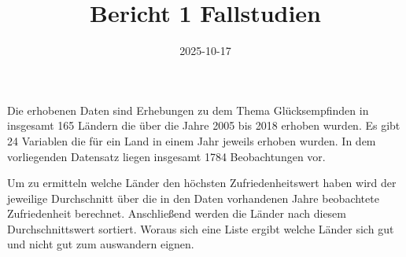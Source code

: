 \documentclass[
]{article}
\title{Bericht 1 Fallstudien}
\author{}
\date{\vspace{-2.5em}2025-10-17}
\newenvironment{Shaded}{\begin{snugshade}}{\end{snugshade}}
\newcommand{\AttributeTok}[1]{\textcolor[rgb]{0.13,0.29,0.53}{#1}}
\newcommand{\CommentTok}[1]{\textcolor[rgb]{0.56,0.35,0.01}{\textit{#1}}}
\newcommand{\DecValTok}[1]{\textcolor[rgb]{0.00,0.00,0.81}{#1}}
\newcommand{\FloatTok}[1]{\textcolor[rgb]{0.00,0.00,0.81}{#1}}
\newcommand{\FunctionTok}[1]{\textcolor[rgb]{0.13,0.29,0.53}{\textbf{#1}}}
\newcommand{\NormalTok}[1]{#1}
\newcommand{\SpecialCharTok}[1]{\textcolor[rgb]{0.81,0.36,0.00}{\textbf{#1}}}
\newcommand{\StringTok}[1]{\textcolor[rgb]{0.31,0.60,0.02}{#1}}
\begin{document}
\maketitle

Die erhobenen Daten sind Erhebungen zu dem Thema Glücksempfinden in
insgesamt 165 Ländern die über die Jahre 2005 bis 2018 erhoben wurden.
Es gibt 24 Variablen die für ein Land in einem Jahr jeweils erhoben
wurden. In dem vorliegenden Datensatz liegen insgesamt 1784
Beobachtungen vor.

Um zu ermitteln welche Länder den höchsten Zufriedenheitswert haben wird
der jeweilige Durchschnitt über die in den Daten vorhandenen Jahre
beobachtete Zufriedenheit berechnet. Anschließend werden die Länder nach
diesem Durchschnittswert sortiert. Woraus sich eine Liste ergibt welche
Länder sich gut und nicht gut zum auswandern eignen.

\begin{Shaded}
\end{Shaded}
\end{document}
